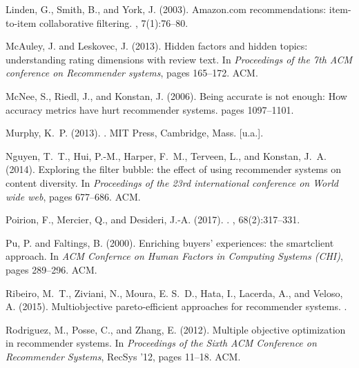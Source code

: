 \documentclass[letterpaper]{article}
\begin{document}
\begin{thebibliography}{}
{Linden}, G., {Smith}, B., and {York}, J. (2003).
\newblock Amazon.com recommendations: item-to-item collaborative filtering.
, 7(1):76--80.

McAuley, J. and Leskovec, J. (2013).
\newblock Hidden factors and hidden topics: understanding rating dimensions
  with review text.
\newblock In {\em Proceedings of the 7th ACM conference on Recommender
  systems}, pages 165--172. ACM.

McNee, S., Riedl, J., and Konstan, J. (2006).
\newblock Being accurate is not enough: How accuracy metrics have hurt
  recommender systems.
\newblock pages 1097--1101.

Murphy, K.~P. (2013).
.
\newblock MIT Press, Cambridge, Mass. [u.a.].

Nguyen, T.~T., Hui, P.-M., Harper, F.~M., Terveen, L., and Konstan, J.~A.
  (2014).
\newblock Exploring the filter bubble: the effect of using recommender systems
  on content diversity.
\newblock In {\em Proceedings of the 23rd international conference on World
  wide web}, pages 677--686. ACM.

Poirion, F., Mercier, Q., and Desideri, J.-A. (2017).
.
, 68(2):317--331.

Pu, P. and Faltings, B. (2000).
\newblock Enriching buyers' experiences: the smartclient approach.
\newblock In {\em ACM Confernce on Human Factors in Computing Systems (CHI)},
  pages 289--296. ACM.

Ribeiro, M.~T., Ziviani, N., Moura, E. S.~D., Hata, I., Lacerda, A., and
  Veloso, A. (2015).
\newblock Multiobjective pareto-efficient approaches for recommender systems.
.

Rodriguez, M., Posse, C., and Zhang, E. (2012).
\newblock Multiple objective optimization in recommender systems.
\newblock In {\em Proceedings of the Sixth ACM Conference on Recommender
  Systems}, RecSys '12, pages 11--18. ACM.


\end{thebibliography}
\end{document}
